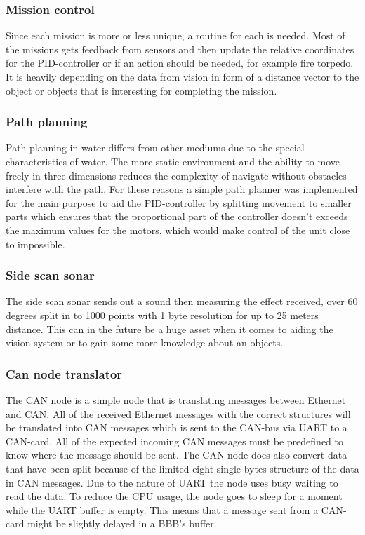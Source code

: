 		\subsubsection{Mission control} %
		\noindent Since each mission is more or less unique, a routine for each is needed.
		Most of the missions gets feedback from sensors and then update the relative coordinates for the PID-controller or if an action should be needed, for example fire torpedo.
		It is heavily depending on the data from vision in form of a distance vector to the object or objects that is interesting for completing the mission.
		
		\subsubsection{Path planning} %
		\noindent Path planning in water differs from other mediums due to the special characteristics of water. The more static environment and the ability to move freely in three dimensions reduces the complexity of navigate without obstacles interfere with the path. For these reasons a simple path planner was implemented for the main purpose to aid the PID-controller by splitting movement to smaller parts which ensures that the proportional part of the controller doesn't exceeds the maximum values for the motors, which would make control of the unit close to impossible. 
		
				\subsubsection{Side scan sonar} %
		\noindent The side scan sonar \cite{side_scan_sonar} sends out a sound then measuring the effect received, over 60 degrees split in to 1000 points with 1 byte resolution for up to 25 meters distance. This can in the future be a huge asset when it comes to aiding the vision system or to gain some more knowledge about an objects.


\subsubsection{Can node translator} %
\noindent The CAN node is a simple node that is translating messages between Ethernet and CAN. All of the received Ethernet messages with the correct structures will be translated into CAN messages which is sent to the CAN-bus via UART to a CAN-card. All of the expected incoming CAN messages must be predefined to know where the message should be sent. The CAN node does also convert data that have been split because of the limited eight single bytes structure of the data in CAN messages. Due to the nature of UART the node uses busy waiting to read the data. To reduce the CPU usage, the node goes to sleep for a moment while the UART buffer is empty. This means that a message sent from a CAN-card might be slightly delayed in a BBB's buffer.


